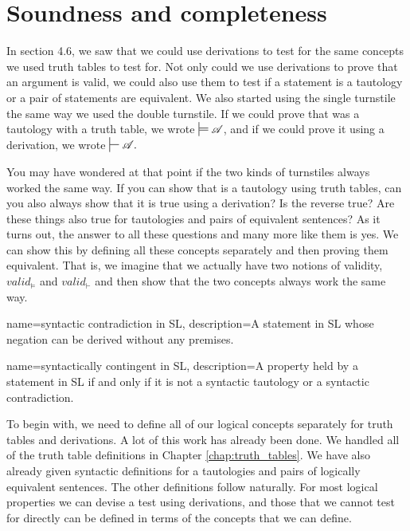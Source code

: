 {%

\section{Soundness and completeness}
\label{sec:soundness_and_completeness}
In section 4.6, we saw that we could use derivations to test for the same concepts we used truth tables to test for. Not only could we use derivations to prove that an argument is valid, we could also use them to test if a statement is a tautology or a pair of statements are equivalent. We also started using the single turnstile the same way we used the double turnstile. If we could prove that  was a tautology with a truth table, we wrote $\sdtstile{}{}\script{A}$, and if we could prove it using a derivation, we wrote $\sststile{}{}\script{A}.$ 

You may have wondered at that point if the two kinds of turnstiles always worked the same way. If you can show that  is a tautology using truth tables, can you also always show that it is true using a derivation? Is the reverse true? Are these things also true for tautologies and pairs of equivalent sentences? As it turns out, the answer to all these questions and many more like them is yes. We can show this by defining all these concepts separately and then proving them equivalent. That is, we imagine that we actually have two notions of validity, $valid_{\models}$ and  $valid_{\vdash}$ and then show that the two concepts always work the same way. 

{
name=syntactic contradiction in SL,
description={A statement in SL whose negation can be derived without any premises.}
}


   
{
name=syntactically contingent in SL,
description={A property held by a statement in SL if and only if it is not a syntactic tautology or a syntactic contradiction.}
}




To begin with, we need to define all of our logical concepts separately for truth tables and derivations. A lot of this work has already been done. We handled all of the truth table definitions in Chapter \ref{chap:truth_tables}. We have also already given syntactic definitions for a tautologies and pairs of logically equivalent sentences. The other definitions follow naturally. For most logical properties we can devise a test using derivations, and those that we cannot test for directly can be defined in terms of the concepts that we can define.

}
